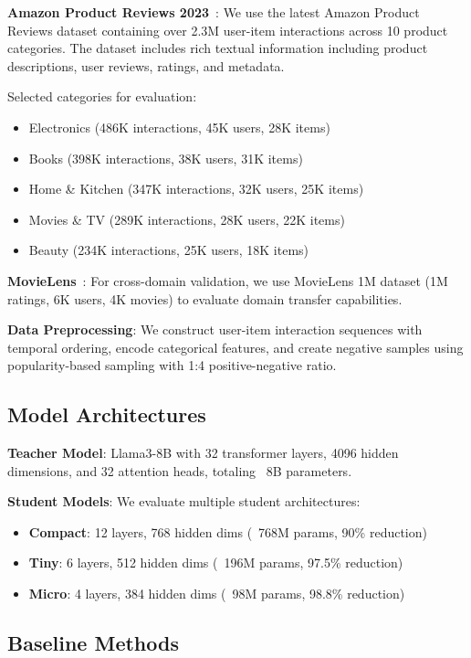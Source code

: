 \documentclass[10pt,conference]{IEEEtran}
\begin{document}
\textbf{Amazon Product Reviews 2023}~\cite{hou2024bridging}: We use the latest Amazon Product Reviews dataset containing over 2.3M user-item interactions across 10 product categories. The dataset includes rich textual information including product descriptions, user reviews, ratings, and metadata.

Selected categories for evaluation:
\begin{itemize}[leftmargin=*]
    \item Electronics (486K interactions, 45K users, 28K items)
    \item Books (398K interactions, 38K users, 31K items)
    \item Home \& Kitchen (347K interactions, 32K users, 25K items)
    \item Movies \& TV (289K interactions, 28K users, 22K items)
    \item Beauty (234K interactions, 25K users, 18K items)
\end{itemize}

\textbf{MovieLens}~\cite{harper2015movielens}: For cross-domain validation, we use MovieLens 1M dataset (1M ratings, 6K users, 4K movies) to evaluate domain transfer capabilities.

\textbf{Data Preprocessing}: We construct user-item interaction sequences with temporal ordering, encode categorical features, and create negative samples using popularity-based sampling with 1:4 positive-negative ratio.

\subsection{Model Architectures}

\textbf{Teacher Model}: Llama3-8B with 32 transformer layers, 4096 hidden dimensions, and 32 attention heads, totaling ~8B parameters.

\textbf{Student Models}: We evaluate multiple student architectures:
\begin{itemize}[leftmargin=*]
    \item \textbf{Compact}: 12 layers, 768 hidden dims (~768M params, 90\% reduction)
    \item \textbf{Tiny}: 6 layers, 512 hidden dims (~196M params, 97.5\% reduction)  
    \item \textbf{Micro}: 4 layers, 384 hidden dims (~98M params, 98.8\% reduction)
\end{itemize}

\subsection{Baseline Methods}
\end{document}
